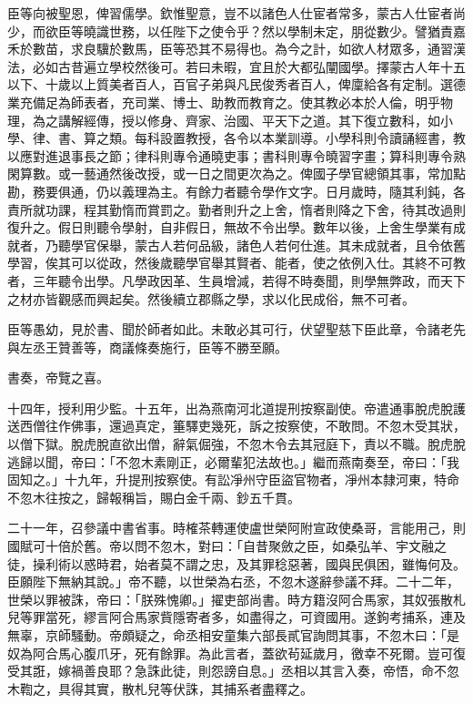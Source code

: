 \begin{pinyinscope}
 臣等向被聖恩，俾習儒學。欽惟聖意，豈不以諸色人仕宦者常多，蒙古人仕宦者尚少，而欲臣等曉識世務，以任陛下之使令乎？然以學制未定，朋從數少。譬猶責嘉禾於數苗，求良驥於數馬，臣等恐其不易得也。為今之計，如欲人材眾多，通習漢法，必如古昔遍立學校然後可。若曰未暇，宜且於大都弘闡國學。擇蒙古人年十五以下、十歲以上質美者百人，百官子弟與凡民俊秀者百人，俾廩給各有定制。選德業充備足為師表者，充司業、博士、助教而教育之。使其教必本於人倫，明乎物理，為之講解經傳，授以修身、齊家、治國、平天下之道。其下復立數科，如小學、律、書、算之類。每科設置教授，各令以本業訓導。小學科則令讀誦經書，教以應對進退事長之節；律科則專令通曉吏事；書科則專令曉習字畫；算科則專令熟閑算數。或一藝通然後改授，或一日之間更次為之。俾國子學官總領其事，常加點勘，務要俱通，仍以義理為主。有餘力者聽令學作文字。日月歲時，隨其利鈍，各責所就功課，程其勤惰而賞罰之。勤者則升之上舍，惰者則降之下舍，待其改過則復升之。假日則聽令學射，自非假日，無故不令出學。數年以後，上舍生學業有成就者，乃聽學官保舉，蒙古人若何品級，諸色人若何仕進。其未成就者，且令依舊學習，俟其可以從政，然後歲聽學官舉其賢者、能者，使之依例入仕。其終不可教者，三年聽令出學。凡學政因革、生員增減，若得不時奏聞，則學無弊政，而天下之材亦皆觀感而興起矣。然後續立郡縣之學，求以化民成俗，無不可者。



 臣等愚幼，見於書、聞於師者如此。未敢必其可行，伏望聖慈下臣此章，令諸老先與左丞王贊善等，商議條奏施行，臣等不勝至願。



 書奏，帝覽之喜。



 十四年，授利用少監。十五年，出為燕南河北道提刑按察副使。帝遣通事脫虎脫護送西僧往作佛事，還過真定，箠驛吏幾死，訴之按察使，不敢問。不忽木受其狀，以僧下獄。脫虎脫直欲出僧，辭氣倔強，不忽木令去其冠庭下，責以不職。脫虎脫逃歸以聞，帝曰：「不忽木素剛正，必爾輩犯法故也。」繼而燕南奏至，帝曰：「我固知之。」十九年，升提刑按察使。有訟凈州守臣盜官物者，凈州本隸河東，特命不忽木往按之，歸報稱旨，賜白金千兩、鈔五千貫。



 二十一年，召參議中書省事。時榷茶轉運使盧世榮阿附宣政使桑哥，言能用己，則國賦可十倍於舊。帝以問不忽木，對曰：「自昔聚斂之臣，如桑弘羊、宇文融之徒，操利術以惑時君，始者莫不謂之忠，及其罪稔惡著，國與民俱困，雖悔何及。臣願陛下無納其說。」帝不聽，以世榮為右丞，不忽木遂辭參議不拜。二十二年，世榮以罪被誅，帝曰：「朕殊愧卿。」擢吏部尚書。時方籍沒阿合馬家，其奴張散札兒等罪當死，繆言阿合馬家貲隱寄者多，如盡得之，可資國用。遂鉤考捕系，連及無辜，京師騷動。帝頗疑之，命丞相安童集六部長貳官詢問其事，不忽木曰：「是奴為阿合馬心腹爪牙，死有餘罪。為此言者，蓋欲茍延歲月，徼幸不死爾。豈可復受其誑，嫁禍善良耶？急誅此徒，則怨謗自息。」丞相以其言入奏，帝悟，命不忽木鞫之，具得其實，散札兒等伏誅，其捕系者盡釋之。




\end{pinyinscope}
